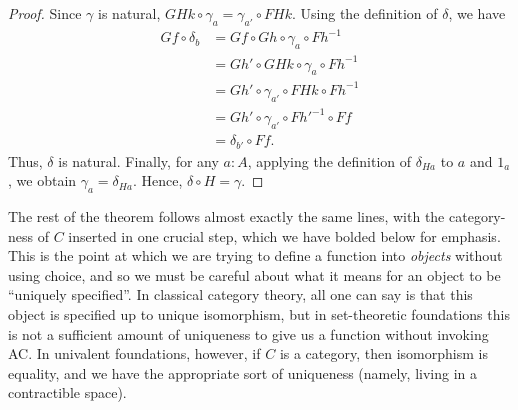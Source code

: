 \documentclass{amsart}
\theoremstyle{definition}
\theoremstyle{remark}
\numberwithin{equation}{section}
\newcommand{\inv}[1]{{#1}^{-1}}
\begin{document}
\begin{proof}
  Since $\gamma$ is natural, $GHk\circ \gamma_a = \gamma_{a'} \circ FHk$.
  Using the definition of $\delta$, we have
  \begin{align*}
    Gf \circ \delta_b
    &= Gf \circ Gh \circ \gamma_a \circ \inv{Fh}\\
    &= Gh' \circ GHk\circ \gamma_a \circ \inv{Fh}\\
    &= Gh' \circ \gamma_{a'} \circ FHk \circ \inv{Fh}\\
    &= Gh' \circ \gamma_{a'} \circ \inv{Fh'} \circ Ff\\
    &= \delta_{b'} \circ Ff.
  \end{align*}
  Thus, $\delta$ is natural.
  Finally, for any $a:A$, applying the definition of $\delta_{Ha}$ to $a$ and $1_a$, we obtain $\gamma_a = \delta_{Ha}$.
  Hence, $\delta \circ H = \gamma$.
\end{proof}

The rest of the theorem follows almost exactly the same lines, with the category-ness of $C$ inserted in one crucial step, which we have bolded below for emphasis.
This is the point at which we are trying to define a function into \emph{objects} without using choice, and so we must be careful about what it means for an object to be ``uniquely specified''.
In classical category theory, all one can say is that this object is specified up to unique isomorphism, but in set-theoretic foundations this is not a sufficient amount of uniqueness to give us a function without invoking AC.
In univalent foundations, however, if $C$ is a category, then isomorphism is equality, and we have the appropriate sort of uniqueness (namely, living in a contractible space).
\end{document}
